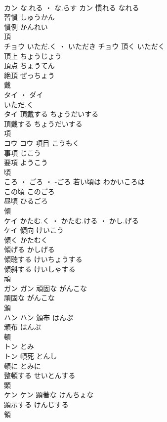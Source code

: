 \documentclass[8pt]{extreport}
\begin{document}
\begin{CJK}{UTF8}{min}
\\	カン	な.れる ・ な.らす	カン	慣れる	なれる	
\\	習慣	しゅうかん	
\\	慣例	かんれい	
\\	頂	
\\	チョウ	いただ.く ・ いただき	チョウ	頂く	いただく	
\\	頂上	ちょうじょう	
\\	頂点	ちょうてん	
\\	絶頂	ぜっちょう	
\\	戴	
\\	タイ ・ ダイ
\\	いただ.く
\\	タイ	頂戴する	ちょうだいする	
\\	頂戴する	ちょうだいする	
\\	項	
\\	コウ		コウ	項目	こうもく	
\\	事項	じこう	
\\	要項	ようこう	
\\	頃	
\\	ころ ・ ごろ ・ -ごろ		若い頃は	わかいころは	
\\	この頃	このごろ	
\\	昼頃	ひるごろ	
\\	傾	
\\	ケイ	かたむ.く ・ かたむ.ける ・ かし.げる
\\	ケイ	傾向	けいこう	
\\	傾く	かたむく	
\\	傾げる	かしげる	
\\	傾聴する	けいちょうする	
\\	傾斜する	けいしゃする	
\\	頑	
\\	ガン		ガン	頑固な	がんこな	
\\	頑固な	がんこな	
\\	頒	
\\	ハン		ハン	頒布	はんぷ	
\\	頒布	はんぷ	
\\	頓	
\\	トン	とみ
\\	トン	頓死	とんし	
\\	頓に	とみに	
\\	整頓する	せいとんする	
\\	顕	
\\	ケン		ケン	顕著な	けんちょな	
\\	顕示する	けんじする	
\\	領	

\end{CJK}
\end{document}
